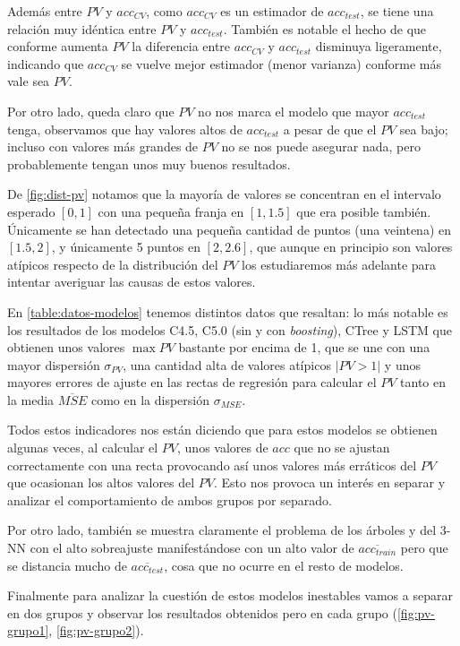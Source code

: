 Además entre $PV$ y $acc_{CV}$, como $acc_{CV}$ es un estimador de $acc_{test}$, se tiene una relación muy idéntica entre $PV$ y $acc_{test}$. También es notable el hecho de que conforme aumenta $PV$ la diferencia entre $acc_{CV}$ y $acc_{test}$ disminuya ligeramente, indicando que $acc_{CV}$ se vuelve mejor estimador (menor varianza) conforme más vale sea $PV$.

Por otro lado, queda claro que $PV$ no nos marca el modelo que mayor $acc_{test}$ tenga, observamos que hay valores altos de $acc_{test}$ a pesar de que el $PV$ sea bajo; incluso con valores más grandes de $PV$ no se nos puede asegurar nada, pero probablemente tengan unos muy buenos resultados.

De \autoref{fig:dist-pv} notamos que la mayoría de valores se concentran en el intervalo esperado $[0, 1]$ con una pequeña franja en $[1, 1.5]$ que era posible también. Únicamente se han detectado una pequeña cantidad de puntos (una veintena) en $[1.5, 2]$, y únicamente 5 puntos en $[2, 2.6]$, que aunque en principio son valores atípicos respecto de la distribución del $PV$ los estudiaremos más adelante para intentar averiguar las causas de estos valores.

En \autoref{table:datos-modelos} tenemos distintos datos que resaltan: lo más notable es los resultados de los modelos C4.5, C5.0 (sin y con \emph{boosting}), CTree y LSTM que obtienen unos valores $\max PV$ bastante por encima de 1, que se une con una mayor dispersión $\sigma_{PV}$, una cantidad alta de valores atípicos $|PV > 1|$ y unos mayores errores de ajuste en las rectas de regresión para calcular el $PV$ tanto en la media $\overline{MSE}$ como en la dispersión $\sigma_{MSE}$.

Todos estos indicadores nos están diciendo que para estos modelos se obtienen algunas veces, al calcular el $PV$, unos valores de $acc$ que no se ajustan correctamente con una recta provocando así unos valores más erráticos del $PV$ que ocasionan los altos valores del $PV$. Esto nos provoca un interés en separar y analizar el comportamiento de ambos grupos por separado.

Por otro lado, también se muestra claramente el problema de los árboles y del $3$-NN con el alto sobreajuste manifestándose con un alto valor de $\overline{acc_{train}}$ pero que se distancia mucho de $\overline{acc_{test}}$, cosa que no ocurre en el resto de modelos.

Finalmente para analizar la cuestión de estos modelos inestables vamos a separar en dos grupos y observar los resultados obtenidos pero en cada grupo (\autoref{fig:pv-grupo1}, \autoref{fig:pv-grupo2}).

